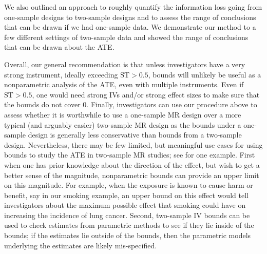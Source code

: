 \documentclass[AMA,STIX1COL,]{WileyNJD-v2}
\begin{document}
We also outlined an approach to roughly quantify the information loss
going from one-sample designs to two-sample designs and to assess the
range of conclusions that can be drawn if we had one-sample data. We
demonstrate our method to a few different settings of two-sample data
and showed the range of conclusions that can be drawn about the ATE.

Overall, our general recommendation is that unless investigators have a
very strong instrument, ideally exceeding \(\text{ST} > 0.5\), bounds
will unlikely be useful as a nonparametric analysis of the ATE, even
with multiple instruments. Even if \(\text{ST} > 0.5\), one would need
strong IVs and/or strong effect sizes to make sure that the bounds do
not cover \(0\). Finally, investigators can use our procedure above to
assess whether it is worthwhile to use a one-sample MR design over a
more typical (and arguably easier) two-sample MR design as the bounds
under a one-sample design is generally less conservative than bounds
from a two-sample design. Nevertheless, there may be few limited, but
meaningful use cases for using bounds to study the ATE in two-sample MR
studies; see \citep{diemer_application_2020} for one example. First when
one has prior knowledge about the direction of the effect, but wish to
get a better sense of the magnitude, nonparametric bounds can provide an
upper limit on this magnitude. For example, when the exposure is known
to cause harm or benefit, say in our smoking example, an upper bound on
this effect would tell investigators about the maximum possible effect
that smoking could have on increasing the incidence of lung cancer.
Second, two-sample IV bounds can be used to check estimates from
parametric methods to see if they lie inside of the bounds; if the
estimates lie outside of the bounds, then the parametric models
underlying the estimates are likely mis-specified.

\newpage



\newpage
\end{document}
